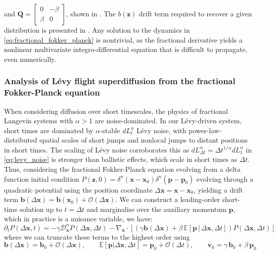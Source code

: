 and $\mathbf{Q} = \begin{bmatrix}
0 & -\beta\\
\beta & 0
\end{bmatrix}$, shown in \cite{qi_fractional_2022}. The $b(\mathbf{z})$ drift term required to recover a given distribution is presented in . Any solution to the dynamics in \cref{eq:fractional_fokker_planck} is nontrivial, as the fractional derivative yields a nonlinear multivariate integro-differential equation that is difficult to propagate, even numerically. 

\subsubsection*{Analysis of Lévy flight superdiffusion from the fractional Fokker-Planck equation}
When considering diffusion over short timescales, the physics of fractional Langevin systems with $\alpha > 1$ are noise-dominated. In our Lévy-driven system, short times are dominated by $\alpha$-stable $dL^{\alpha}_t$ Lévy noise, with power-law-distributed spatial scales of short jumps and nonlocal jumps to distant positions in short times. The scaling of Lévy noise corroborates this as $dL^{\alpha}_{\Delta t} = \Delta t^{1/\alpha} dL^{\alpha}_1$ in \cref{eq:levy_noise} is stronger than ballistic effects, which scale in short times as $\Delta t$. Thus, considering the fractional Fokker-Planck equation evolving from a delta function initial condition $P(\mathbf{z},0) = \delta^n(\textbf{x} -\textbf{x}_0)\delta^n(\textbf{p} - \textbf{p}_0)$ evolving through a quadratic potential using the position coordinate $\Delta \textbf{x} = \textbf{x} - \textbf{x}_0$, yielding a drift term $\textbf{b}(\Delta \textbf{x}) = \textbf{b}(\textbf{x}_0) + \mathcal{O}(\Delta \textbf{x})$. We can construct a leading-order short-time solution up to $t=\Delta t$ and marginalise over the auxiliary momentum $\textbf{p}$, which in practice is a nuisance variable, we have:
\begin{equation}
    \partial_t P(\Delta \textbf{x},t) = -\gamma\mathcal{D}_{\textbf{x}}^{\alpha}P(\Delta \textbf{x}, \Delta t) - \nabla_{\mathbf{x}}\cdot
    \left[\left(\gamma \mathbf{b}(\Delta \textbf{x}) + \beta\,\mathbb{E}[\mathbf{p}\,|\,\Delta \textbf{x},\Delta t]\right)P(\Delta \textbf{x},\Delta t)\right]
\end{equation}
where we can truncate these terms to the highest order using
\begin{equation}
    \mathbf{b}(\Delta \textbf{x}) = \mathbf{b}_0 + \mathcal{O}(\Delta \textbf{x}),\qquad 
    \mathbb{E}[\mathbf{p}|\Delta \textbf{x},\Delta t] = \mathbf{p}_0 + \mathcal{O}(\Delta t), \qquad
    \mathbf{v}_0 = \gamma\,\mathbf{b}_0 + \beta\,\mathbf{p}_0
\end{equation}
